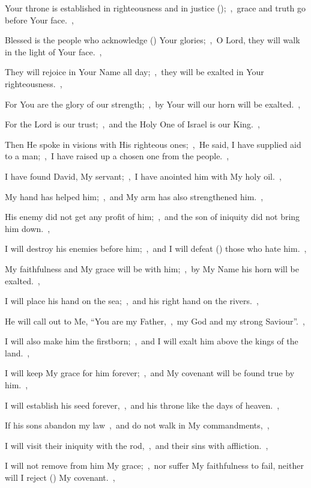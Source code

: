 \documentclass[12pt,twoside,a5paper]{article}
\begin{document}
\begin{halfparskip}
  Your throne is established in righteousness and in justice ();~\sep\ grace and truth go before Your face.~\sep

  Blessed is the people who acknowledge () Your glories;~\sep\ O Lord, they will walk in the light of Your face.~\sep

  They will rejoice in Your Name all day;~\sep\ they will be exalted in Your righteousness.~\sep

  For You are the glory of our strength;~\sep\ by Your will our horn will be exalted.~\sep

  For the Lord is our trust;~\sep\ and the Holy One of Israel is our King.~\sep

  Then He spoke in visions with His righteous ones;~\sep\ He said, I have supplied aid to a man;~\sep\ I have raised up a chosen one from the people.~\sep

  I have found David, My servant;~\sep\ I have anointed him with My holy oil.~\sep

  My hand has helped him;~\sep\ and My arm has also strengthened him.~\sep

  His enemy did not get any profit of him;~\sep\ and the son of iniquity did not bring him down.~\sep

  I will destroy his enemies before him;~\sep\ and I will defeat () those who hate him.~\sep

  My faithfulness and My grace will be with him;~\sep\ by My Name his horn will be exalted.~\sep

   I will place his hand on the sea;~\sep\ and his right hand on the rivers.~\sep

  He will call out to Me, ``You are my Father,~\sep\ my God and my strong Saviour''.~\sep

  I will also make him the firstborn;~\sep\ and I will exalt him above the kings of the land.~\sep

  I will keep My grace for him forever;~\sep\ and My covenant will be found true by him.~\sep

  I will establish his seed forever,~\sep\ and his throne like the days of heaven.~\sep

  If his sons abandon my law~\sep\ and do not walk in My commandments,~\sep

  I will visit their iniquity with the rod,~\sep\ and their sins with affliction.~\sep

  I will not remove from him My grace;~\sep\ nor suffer My faithfulness to fail, neither will I reject () My covenant.~\sep


\end{halfparskip}
\end{document}
